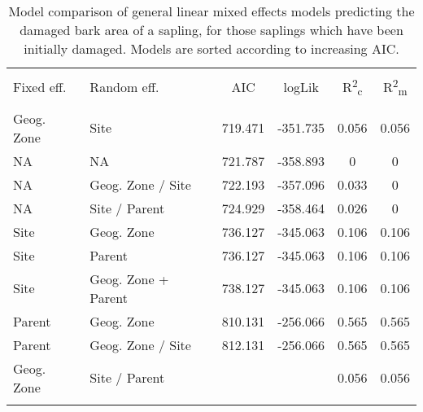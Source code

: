 
\begin{table}[!htbp] \centering 
  \caption{Model comparison of general linear mixed effects models predicting the damaged bark area of a sapling, for those saplings which have been initially damaged. Models are sorted according to increasing AIC.} 
  \label{lmer_comp} 
\begin{tabular}{@{\extracolsep{5pt}} llS[table-format=3.2]S[table-format=3.2]S[table-format=3.2]S[table-format=3.2]} 
\\[-1.8ex]\hline 
\hline \\[-1.8ex] 
{Fixed eff.} & {Random eff.} & {AIC} & {logLik} & {R\textsuperscript{2}\textsubscript{c}} & {R\textsuperscript{2}\textsubscript{m}} \\
\hline \\[-1.8ex] 
Geog. Zone & Site & 719.471 & -351.735 & 0.056 & 0.056 \\ 
NA & NA & 721.787 & -358.893 & 0 & 0 \\ 
NA & Geog. Zone / Site & 722.193 & -357.096 & 0.033 & 0 \\ 
NA & Site / Parent & 724.929 & -358.464 & 0.026 & 0 \\ 
Site & Geog. Zone & 736.127 & -345.063 & 0.106 & 0.106 \\ 
Site & Parent & 736.127 & -345.063 & 0.106 & 0.106 \\ 
Site & Geog. Zone + Parent & 738.127 & -345.063 & 0.106 & 0.106 \\ 
Parent & Geog. Zone & 810.131 & -256.066 & 0.565 & 0.565 \\ 
Parent & Geog. Zone / Site & 812.131 & -256.066 & 0.565 & 0.565 \\ 
Geog. Zone & Site / Parent &  &  & 0.056 & 0.056 \\ 
\hline \\[-1.8ex] 
\end{tabular} 
\end{table} 
